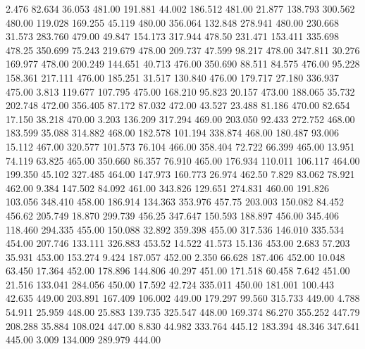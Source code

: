    2.476   82.634   36.053       481.00
 191.881   44.002  186.512       481.00
  21.877  138.793  300.562       480.00
 119.028  169.255   45.119       480.00
 356.064  132.848  278.941       480.00
 230.668   31.573  283.760       479.00
  49.847  154.173  317.944       478.50
 231.471  153.411  335.698       478.25
 350.699   75.243  219.679       478.00
 209.737   47.599   98.217       478.00
 347.811   30.276  169.977       478.00
 200.249  144.651   40.713       476.00
 350.690   88.511   84.575       476.00
  95.228  158.361  217.111       476.00
 185.251   31.517  130.840       476.00
 179.717   27.180  336.937       475.00
   3.813  119.677  107.795       475.00
 168.210   95.823   20.157       473.00
 188.065   35.732  202.748       472.00
 356.405   87.172   87.032       472.00
  43.527   23.488   81.186       470.00
  82.654   17.150   38.218       470.00
   3.203  136.209  317.294       469.00
 203.050   92.433  272.752       468.00
 183.599   35.088  314.882       468.00
 182.578  101.194  338.874       468.00
 180.487   93.006   15.112       467.00
 320.577  101.573   76.104       466.00
 358.404   72.722   66.399       465.00
  13.951   74.119   63.825       465.00
 350.660   86.357   76.910       465.00
 176.934  110.011  106.117       464.00
 199.350   45.102  327.485       464.00
 147.973  160.773   26.974       462.50
   7.829   83.062   78.921       462.00
   9.384  147.502   84.092       461.00
 343.826  129.651  274.831       460.00
 191.826  103.056  348.410       458.00
 186.914  134.363  353.976       457.75
 203.003  150.082   84.452       456.62
 205.749   18.870  299.739       456.25
 347.647  150.593  188.897       456.00
 345.406  118.460  294.335       455.00
 150.088   32.892  359.398       455.00
 317.536  146.010  335.534       454.00
 207.746  133.111  326.883       453.52
  14.522   41.573   15.136       453.00
   2.683   57.203   35.931       453.00
 153.274    9.424  187.057       452.00
   2.350   66.628  187.406       452.00
  10.048   63.450   17.364       452.00
 178.896  144.806   40.297       451.00
 171.518   60.458    7.642       451.00
  21.516  133.041  284.056       450.00
  17.592   42.724  335.011       450.00
 181.001  100.443   42.635       449.00
 203.891  167.409  106.002       449.00
 179.297   99.560  315.733       449.00
   4.788   54.911   25.959       448.00
  25.883  139.735  325.547       448.00
 169.374   86.270  355.252       447.79
 208.288   35.884  108.024       447.00
   8.830   44.982  333.764       445.12
 183.394   48.346  347.641       445.00
   3.009  134.009  289.979       444.00
